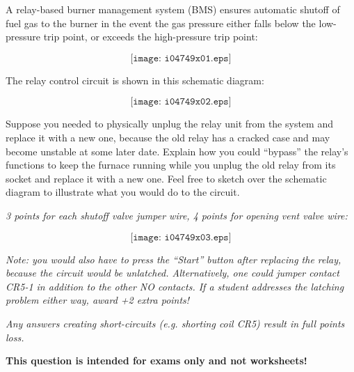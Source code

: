 

A relay-based burner management system (BMS) ensures automatic shutoff of fuel gas to the burner in the event the gas pressure either falls below the low-pressure trip point, or exceeds the high-pressure trip point:

$$\texttt{[image: i04749x01.eps]}$$

The relay control circuit is shown in this schematic diagram:

$$\texttt{[image: i04749x02.eps]}$$

Suppose you needed to physically unplug the relay unit from the system and replace it with a new one, because the old relay has a cracked case and may become unstable at some later date.  Explain how you could ``bypass'' the relay's functions to keep the furnace running while you unplug the old relay from its socket and replace it with a new one.  Feel free to sketch over the schematic diagram to illustrate what you would do to the circuit.







{\it 3 points for each shutoff valve jumper wire, 4 points for opening vent valve wire:}

$$\texttt{[image: i04749x03.eps]}$$

{\it Note: you would also have to press the ``Start'' button after replacing the relay, because the circuit would be unlatched.  Alternatively, one could jumper contact CR5-1 in addition to the other NO contacts.  If a student addresses the latching problem either way, award +2 extra points!}

\vskip 10pt

{\it Any answers creating short-circuits (e.g. shorting coil CR5) result in full points loss.}







{\bf This question is intended for exams only and not worksheets!}



